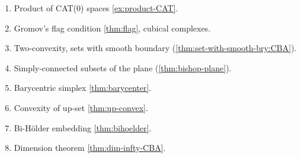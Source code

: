 \begin{enumerate}
\item Product of CAT(0) spaces \ref{ex:product-CAT}.
\item Gromov's flag condition \ref{thm:flag}, cubical complexes.
\item Two-convexity, sets with smooth boundary (\ref{thm:set-with-smooth-bry:CBA}).
\item Simply-connected subsets of the plane (\ref{thm:bishop-plane}).
\item Barycentric simplex \ref{thm:barycenter}.
\item Convexity of up-set \ref{thm:up-convex}.
\item Bi-H\"older embedding \ref{thm:bihoelder}.
\item Dimension theorem \ref{thm:dim-infty-CBA}.
\end{enumerate}

